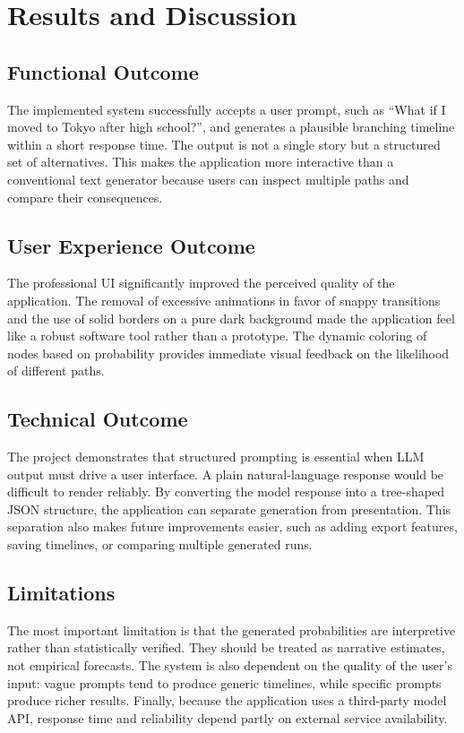 \documentclass[12pt,a4paper]{report}
\begin{document}
\chapter{Results and Discussion}

\section{Functional Outcome}
The implemented system successfully accepts a user prompt, such as ``What if I moved to Tokyo after high school?'', and generates a plausible branching timeline within a short response time. The output is not a single story but a structured set of alternatives. This makes the application more interactive than a conventional text generator because users can inspect multiple paths and compare their consequences.

\section{User Experience Outcome}
The professional UI significantly improved the perceived quality of the application. The removal of excessive animations in favor of snappy transitions and the use of solid borders on a pure dark background made the application feel like a robust software tool rather than a prototype. The dynamic coloring of nodes based on probability provides immediate visual feedback on the likelihood of different paths.

\section{Technical Outcome}
The project demonstrates that structured prompting is essential when LLM output must drive a user interface. A plain natural-language response would be difficult to render reliably. By converting the model response into a tree-shaped JSON structure, the application can separate generation from presentation. This separation also makes future improvements easier, such as adding export features, saving timelines, or comparing multiple generated runs.

\section{Limitations}
The most important limitation is that the generated probabilities are interpretive rather than statistically verified. They should be treated as narrative estimates, not empirical forecasts. The system is also dependent on the quality of the user's input: vague prompts tend to produce generic timelines, while specific prompts produce richer results. Finally, because the application uses a third-party model API, response time and reliability depend partly on external service availability.
\end{document}
